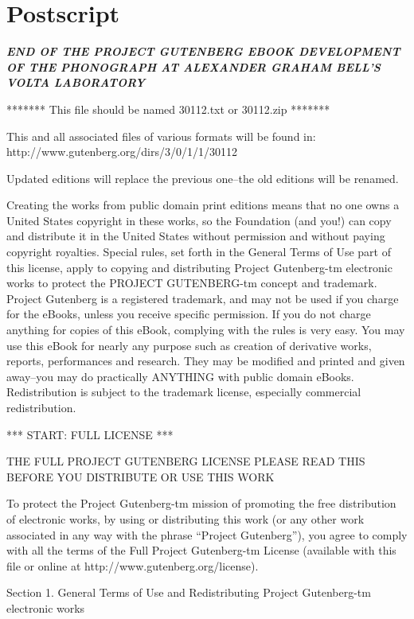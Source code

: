 \documentclass[12pt,oneside]{scrbook}
\begin{document}
  \section*{Postscript}\label{postscript}
  
  \textbf{\emph{END OF THE PROJECT GUTENBERG EBOOK DEVELOPMENT OF THE
  PHONOGRAPH AT ALEXANDER GRAHAM BELL'S VOLTA LABORATORY}}
  
  ******* This file should be named 30112.txt or 30112.zip *******
  
  This and all associated files of various formats will be found in:
  http://www.gutenberg.org/dirs/3/0/1/1/30112
  
  Updated editions will replace the previous one--the old editions will be
  renamed.
  
  Creating the works from public domain print editions means that no one
  owns a United States copyright in these works, so the Foundation (and
  you!) can copy and distribute it in the United States without permission
  and without paying copyright royalties. Special rules, set forth in the
  General Terms of Use part of this license, apply to copying and
  distributing Project Gutenberg-tm electronic works to protect the
  PROJECT GUTENBERG-tm concept and trademark. Project Gutenberg is a
  registered trademark, and may not be used if you charge for the eBooks,
  unless you receive specific permission. If you do not charge anything
  for copies of this eBook, complying with the rules is very easy. You may
  use this eBook for nearly any purpose such as creation of derivative
  works, reports, performances and research. They may be modified and
  printed and given away--you may do practically ANYTHING with public
  domain eBooks. Redistribution is subject to the trademark license,
  especially commercial redistribution.
  
  *** START: FULL LICENSE ***
  
  THE FULL PROJECT GUTENBERG LICENSE PLEASE READ THIS BEFORE YOU
  DISTRIBUTE OR USE THIS WORK
  
  To protect the Project Gutenberg-tm mission of promoting the free
  distribution of electronic works, by using or distributing this work (or
  any other work associated in any way with the phrase ``Project
  Gutenberg''), you agree to comply with all the terms of the Full Project
  Gutenberg-tm License (available with this file or online at
  http://www.gutenberg.org/license).
  
  Section 1. General Terms of Use and Redistributing Project Gutenberg-tm
  electronic works
  
\end{document}
